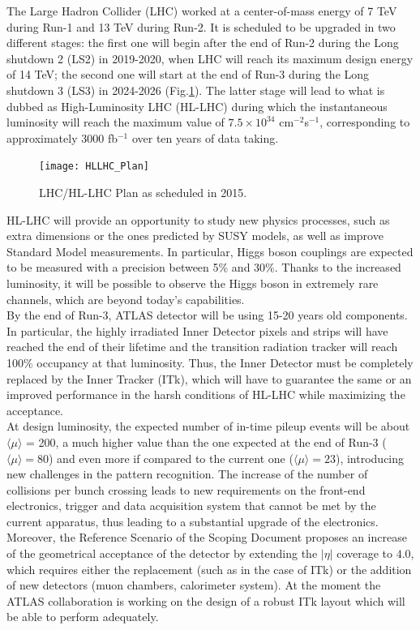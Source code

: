\documentclass[a4paper,twoside,12pt]{book}
\begin{document}
The Large Hadron Collider (LHC) worked at a center-of-mass energy of 7 TeV during Run-1 and 13 TeV during Run-2. It is scheduled to be upgraded in two different stages: the first one will begin after the end of Run-2 during the Long shutdown 2 (LS2) in 2019-2020, when LHC will reach its maximum design energy of 14 TeV; the second one will start at the end of Run-3 during the Long shutdown 3 (LS3) in 2024-2026 (Fig.\ref{fig:HLLHC_Plan}). The latter stage will lead to what is dubbed as High-Luminosity LHC (HL-LHC) during which the
instantaneous luminosity will reach the maximum value of $7.5 \times 10^{34}$ cm$^{-2}$s$^{-1}$, corresponding to approximately 3000 fb$^{-1}$ over ten years of data taking. \\

\begin{figure} [h]
	\texttt{[image: HLLHC\_Plan]}
	\caption{LHC/HL-LHC Plan as scheduled in 2015\cite{scoping}.}
	\label{fig:HLLHC_Plan}
\end{figure}

HL-LHC will provide an opportunity to study new physics processes, such as extra dimensions or the ones predicted by SUSY models, as well as improve Standard Model measurements. In particular, Higgs boson 
couplings are expected to be measured with a precision between 5\% and 30\%\cite{loi}. Thanks to the increased luminosity, it will be possible to observe the Higgs boson in extremely
rare channels, which are beyond today's capabilities.\\

By the end of Run-3, ATLAS detector will be using 15-20 years old components. In particular,
the highly irradiated Inner Detector pixels and strips will have reached the end of their
lifetime and the transition radiation tracker will reach 100\% occupancy at that luminosity. Thus, the Inner Detector must be completely replaced by the Inner Tracker (ITk), which will
have to guarantee the same or an improved performance in the harsh conditions of HL-LHC while maximizing the acceptance. \\

At design luminosity, the expected number of in-time pileup events will be about $\langle\mu\rangle$ = 200, a much
higher value than the one expected at the end of Run-3 ($\langle\mu\rangle = 80$) and even more if 
compared to the current one ($\langle\mu\rangle = 23$), introducing new challenges in the pattern
recognition. The increase of the number
of collisions per bunch crossing leads to new requirements on the front-end electronics, trigger and data acquisition system that cannot be met by the current apparatus, thus leading to a 
substantial upgrade of the electronics. Moreover, the Reference Scenario of the Scoping Document\cite{scoping} proposes an increase of the geometrical acceptance of the detector by extending the $|\eta|$ coverage to $4.0$, which requires either the replacement (such as in the case of ITk) or the addition of new detectors (muon chambers,
calorimeter system). 
At the moment the ATLAS collaboration is working on the design of a robust ITk layout which will be able to perform adequately.\\
\end{document}
